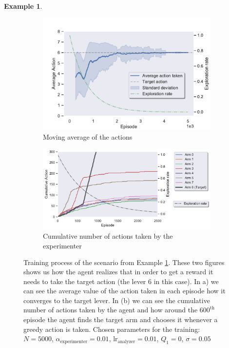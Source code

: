 \documentclass[11pt,a4paper,twoside]{report}
\newcommand{\+}{\textnormal{+} }
\theoremstyle{definition}
\newtheorem{myex}[mythm]{Example}
\numberwithin{equation}{chapter}
\begin{document}
  \begin{myex}\label{MAB1ex}

    \begin{figure}[]
      \centering
      \begin{subfigure}{.5\textwidth}
        \centering
        \includegraphics[width=1\linewidth]{figures/Actions-MAB1.pdf}
        \caption{Moving average of the actions}
        \label{fig:ActionAverageMAB1}
      \end{subfigure}%
      \begin{subfigure}{.5\textwidth}
        \centering
        \includegraphics[width=1\linewidth]{figures/Cum-action-MAB1.pdf}
        \caption{Cumulative number of actions taken by the experimenter}
        \label{fig:actionsMAB1}
      \end{subfigure}
      \caption{Training process of the scenario from Example \ref{MAB1ex}. These two figures shows us how
      the agent realizes that in order to get a reward it needs to take the target
      action (the lever 6 in this case). In a) we can see the average value of
      the action taken in each episode how it converges to the target lever. In
      (b) we can see the cumulative number of actions taken by the agent and how
      around the $600^\text{th}$ episode the agent finds the target arm and
      chooses it whenever a greedy action is taken. Chosen parameters for the
      training: $N=5000$, $\alpha_\text{experimenter}=0.01$,
      $\text{lr}_\text{analyzer}=0.01$, $Q_1=0$, $\sigma=0.05$}
    \end{figure}  




\end{myex}
\end{document}
